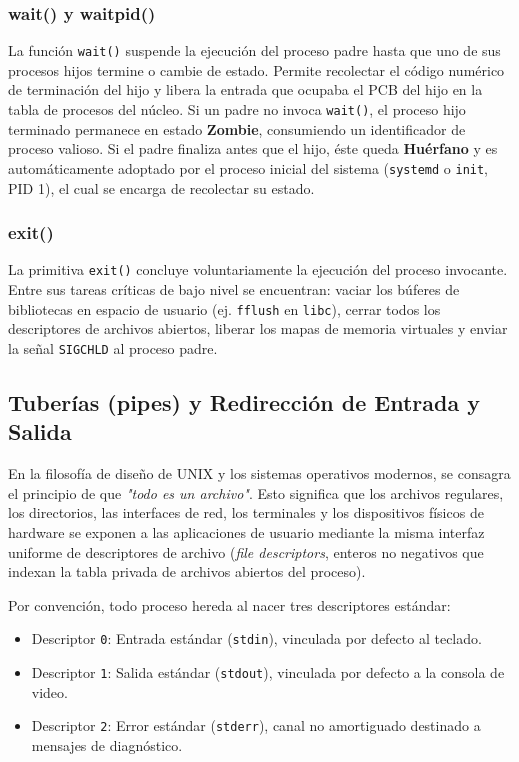 \documentclass[11pt,letterpaper]{article}
\begin{document}
\subsubsection{wait() y waitpid()}
La función \texttt{wait()} suspende la ejecución del proceso padre hasta que uno de sus procesos hijos termine o cambie de estado. Permite recolectar el código numérico de terminación del hijo y libera la entrada que ocupaba el PCB del hijo en la tabla de procesos del núcleo. Si un padre no invoca \texttt{wait()}, el proceso hijo terminado permanece en estado \textbf{Zombie}, consumiendo un identificador de proceso valioso. Si el padre finaliza antes que el hijo, éste queda \textbf{Huérfano} y es automáticamente adoptado por el proceso inicial del sistema (\texttt{systemd} o \texttt{init}, PID 1), el cual se encarga de recolectar su estado.

\subsubsection{exit()}
La primitiva \texttt{exit()} concluye voluntariamente la ejecución del proceso invocante. Entre sus tareas críticas de bajo nivel se encuentran: vaciar los búferes de bibliotecas en espacio de usuario (ej. \texttt{fflush} en \texttt{libc}), cerrar todos los descriptores de archivos abiertos, liberar los mapas de memoria virtuales y enviar la señal \texttt{SIGCHLD} al proceso padre.

\subsection{Tuberías (pipes) y Redirección de Entrada y Salida}

En la filosofía de diseño de UNIX y los sistemas operativos modernos, se consagra el principio de que \textit{"todo es un archivo"}. Esto significa que los archivos regulares, los directorios, las interfaces de red, los terminales y los dispositivos físicos de hardware se exponen a las aplicaciones de usuario mediante la misma interfaz uniforme de descriptores de archivo (\textit{file descriptors}, enteros no negativos que indexan la tabla privada de archivos abiertos del proceso).

Por convención, todo proceso hereda al nacer tres descriptores estándar:
\begin{itemize}
    \item Descriptor \texttt{0}: Entrada estándar (\texttt{stdin}), vinculada por defecto al teclado.
    \item Descriptor \texttt{1}: Salida estándar (\texttt{stdout}), vinculada por defecto a la consola de video.
    \item Descriptor \texttt{2}: Error estándar (\texttt{stderr}), canal no amortiguado destinado a mensajes de diagnóstico.
\end{itemize}
\end{document}
